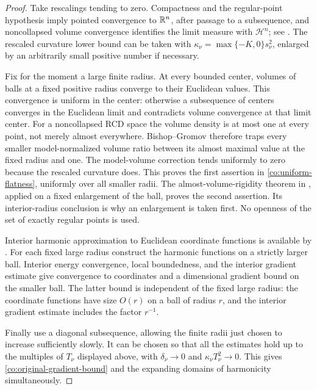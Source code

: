 \begin{proof}
Take rescalings tending to zero.  Compactness and the regular-point
hypothesis imply pointed convergence to \(\mathbb R^n\), after passage to
a subsequence, and noncollapsed volume convergence identifies the
limit measure with \(\mathcal H^n\); see \cite{DPG18}.  The rescaled
curvature lower bound can be taken with
\(\kappa_\nu=\max\{-K,0\}s_\nu^2\), enlarged by an arbitrarily
small positive number if necessary.

Fix for the moment a large finite radius.  At every bounded center,
volumes of balls at a fixed positive radius converge to their
Euclidean values.  This convergence is uniform in the center:
otherwise a subsequence of centers converges in the Euclidean
limit and contradicts volume convergence at that limit center.
For a noncollapsed RCD space the volume density is at most one at
every point, not merely almost everywhere.  Bishop--Gromov
therefore traps every smaller model-normalized volume ratio
between its almost maximal value at the fixed radius and one.
The model-volume correction tends uniformly to zero because the
rescaled curvature does.  This proves the first assertion in
\eqref{co:uniform-flatness}, uniformly over all smaller radii.
The almost-volume-rigidity theorem in \cite{DPG18}, applied on a
fixed enlargement of the ball, proves the second assertion.  Its
interior-radius conclusion is why an enlargement is taken first.
No openness of the set of exactly regular points is used.

Interior harmonic approximation to Euclidean coordinate functions
is available by \cite[Corollary~4.12]{AH18}.  For each fixed large
radius construct the harmonic functions on a strictly larger
ball.  Interior energy convergence, local boundedness, and the
interior gradient estimate give convergence to coordinates and a
dimensional gradient bound on the smaller ball.  The latter bound
is independent of the fixed large radius: the coordinate functions
have size \(O(r)\) on a ball of radius \(r\), and the interior
gradient estimate includes the factor \(r^{-1}\).

Finally use a diagonal subsequence, allowing the finite radii just
chosen to increase sufficiently slowly.  It can be chosen so that
all the estimates hold up to the multiples of \(T_\nu\) displayed
above, with \(\delta_\nu\to0\) and
\(\kappa_\nu T_\nu^2\to0\).  This gives
\eqref{co:original-gradient-bound} and the expanding domains of
harmonicity simultaneously.
\end{proof}

